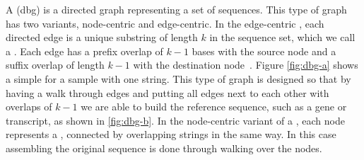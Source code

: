 A \dbg (dbg) is a directed graph representing a set of sequences. This type of graph has two variants, node-centric and edge-centric. In the edge-centric \dbg, each directed edge is a unique substring of length $k$ in the sequence set, which we call a \kmer. Each edge has a prefix overlap of $k-1$ bases with the source node and a suffix overlap of length $k-1$ with the destination node~\cite{paten2017genome}. Figure \ref{fig:dbg-a} shows a simple \dbg for a sample with one string. This type of graph is designed so that by having a walk through edges and putting all edges next to each other with overlaps of $k-1$ we are able to build the reference sequence, such as a gene or transcript, as shown in \ref{fig:dbg-b}. In the node-centric variant of a \dbg, each node represents a \kmer, connected by overlapping strings in the same way. In this case assembling the original sequence is done through walking over the nodes.


